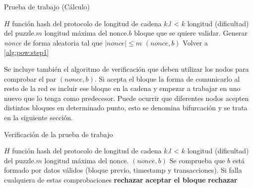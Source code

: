 \begin{algorithm}
\caption{Prueba de trabajo (Cálculo)}\label{alg:pow}
\begin{algorithmic}[1]
\Require \Statex $H$ función hash del protocolo de longitud de cadena $k$.\Statex $l$ < $k$ longitud (dificultad) del puzzle.\Statex $m$ longitud máxima del nonce.\Statex $b$ bloque que se quiere validar.
\State Generar \textit{nonce} de forma aleatoria tal que $|nonce| \leq m$ \label{alg:pow:step1}
 \Return $(nonce, b)$
\Else  Volver a  \ref{alg:pow:step1}
\EndIf
\end{algorithmic}
\end{algorithm}

Se incluye también el algoritmo de verificación que deben utilizar los nodos para comprobar el par $(nonce, b)$. Si acepta el bloque la forma de comunicarlo al resto de la red es incluir ese bloque en la cadena y empezar a trabajar en uno nuevo que lo tenga como predecesor. Puede ocurrir que diferentes nodos acepten distintos bloques en determinado punto, esto se denomina bifurcación y se trata en la siguiente sección.
\begin{algorithm}
\caption{Verificación de la prueba de trabajo}\label{alg:pow_check}
\begin{algorithmic}[1]
\Require \Statex $H$ función hash del protocolo de longitud de cadena $k$.\Statex $l$ < $k$ longitud (dificultad) del puzzle.\Statex $m$ longitud máxima del nonce. \Statex $(nonce, b)$
\State Se comprueba que $b$ está formado por datos válidos (bloque previo, timestamp y transacciones). Si falla cualquiera de estas comprobaciones \textbf{rechazar}
 \Return \textbf{aceptar el bloque}
\Else  \textbf{ rechazar}
\EndIf
\end{algorithmic}
\end{algorithm}

\begin{figure}[H]
  \qquad
	\label{fig:flux}%
\end{figure}

